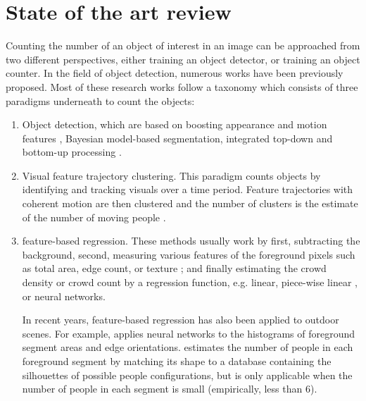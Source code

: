 \newpage
\chapter{State of the art review}

\label{sec:stateoftheart}
Counting the number of an object of interest in an image can be approached from two different perspectives, either training an object detector, or training an object counter\cite{segui2015learning}. In the field of object detection, numerous works have been previously proposed\cite{paragios2001mrf, cho1999neural, regazzoni1996distributed, davies1995crowd, kong2005counting, marana1998efficacy, viola2004robust}. Most of these research works follow a taxonomy which consists of three paradigms underneath to count the objects:
\begin{enumerate}
	\item Object detection, which are based on boosting appearance and motion features \cite{viola2005detecting, viola2004robust}, Bayesian model-based segmentation\cite{zhao2003bayesian}, integrated top-down and bottom-up processing \cite{leibe2005pedestrian, oliva2003top,chan2008privacy}.
	\item Visual feature trajectory clustering. This paradigm counts objects by identifying and tracking visuals over a  time period. Feature trajectories with coherent motion are then clustered and the number of clusters is the estimate of the number of moving people \cite{rabaud2006counting, brostow2006unsupervised,chan2008privacy}. 
	\item feature-based regression. These methods usually work by first, subtracting the background, second, measuring various features of the foreground pixels such as total area\cite{paragios2001mrf, davies1995crowd}, edge count\cite{cho1999neural, regazzoni1996distributed}, or texture \cite{marana1998efficacy}; and finally estimating the crowd density or crowd count by a regression function, e.g. linear\cite{paragios2001mrf, davies1995crowd}, piece-wise linear \cite{regazzoni1996distributed}, or neural networks\cite{cho1999neural, regazzoni1996distributed}. 

	\indent In recent years, feature-based regression has also been applied to outdoor scenes. For example, \citealt{kong2005counting} applies neural networks to the histograms of foreground segment areas and edge orientations. \citealt{dong2007fast} estimates the number of people in each foreground segment by matching its shape to a database containing the silhouettes of possible people configurations, but is only applicable when the number of people in each segment is small (empirically, less than 6)\cite{chan2008privacy}.  
\end{enumerate} 
